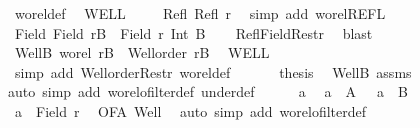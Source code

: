 \begin{isabellebody}
\ wo{\isacharunderscore}{\kern0pt}rel{\isacharunderscore}{\kern0pt}def\ \isamarkupfalse%
\ WELL\ \isacommand{{\isachardot}{\kern0pt}}\isamarkupfalse%
\isanewline
\ \ \isamarkupfalse%
\ Refl{\isacharcolon}{\kern0pt}\ {\isachardoublequoteopen}Refl\ r{\isachardoublequoteclose}\ \isamarkupfalse%
\ {\isacharparenleft}{\kern0pt}simp\ add{\isacharcolon}{\kern0pt}\ wo{\isacharunderscore}{\kern0pt}rel{\isachardot}{\kern0pt}REFL{\isacharparenright}{\kern0pt}\isanewline
\ \ \isamarkupfalse%
\ Field{\isacharcolon}{\kern0pt}\ {\isachardoublequoteopen}Field\ {\isacharquery}{\kern0pt}rB\ {\isacharequal}{\kern0pt}\ Field\ r\ Int\ B{\isachardoublequoteclose}\isanewline
\ \ \isamarkupfalse%
\ Refl{\isacharunderscore}{\kern0pt}Field{\isacharunderscore}{\kern0pt}Restr\ \isamarkupfalse%
\ blast\isanewline
\ \ \isamarkupfalse%
\ WellB{\isacharcolon}{\kern0pt}\ {\isachardoublequoteopen}wo{\isacharunderscore}{\kern0pt}rel\ {\isacharquery}{\kern0pt}rB\ {\isasymand}\ Well{\isacharunderscore}{\kern0pt}order\ {\isacharquery}{\kern0pt}rB{\isachardoublequoteclose}\ \isamarkupfalse%
\ WELL\isanewline
\ \ \isamarkupfalse%
\ {\isacharparenleft}{\kern0pt}simp\ add{\isacharcolon}{\kern0pt}\ Well{\isacharunderscore}{\kern0pt}order{\isacharunderscore}{\kern0pt}Restr\ wo{\isacharunderscore}{\kern0pt}rel{\isacharunderscore}{\kern0pt}def{\isacharparenright}{\kern0pt}\isanewline
\ \ \isanewline
\ \ \isamarkupfalse%
\ {\isacharquery}{\kern0pt}thesis\ \isamarkupfalse%
\ WellB\ assms\isanewline
\ \ \isamarkupfalse%
{\isacharparenleft}{\kern0pt}auto\ simp\ add{\isacharcolon}{\kern0pt}\ wo{\isacharunderscore}{\kern0pt}rel{\isachardot}{\kern0pt}ofilter{\isacharunderscore}{\kern0pt}def\ under{\isacharunderscore}{\kern0pt}def{\isacharparenright}{\kern0pt}\isanewline
\ \ \ \ \isamarkupfalse%
\ a\ \isamarkupfalse%
\ {\isachardoublequoteopen}a\ {\isasymin}\ A{\isachardoublequoteclose}\ \ {\isacharasterisk}{\kern0pt}{\isacharcolon}{\kern0pt}\ {\isachardoublequoteopen}a\ {\isasymin}\ B{\isachardoublequoteclose}\isanewline
\ \ \ \ \isamarkupfalse%
\ {\isachardoublequoteopen}a\ {\isasymin}\ Field\ r{\isachardoublequoteclose}\ \isamarkupfalse%
\ OFA\ Well\ \isamarkupfalse%
\ {\isacharparenleft}{\kern0pt}auto\ simp\ add{\isacharcolon}{\kern0pt}\ wo{\isacharunderscore}{\kern0pt}rel{\isachardot}{\kern0pt}ofilter{\isacharunderscore}{\kern0pt}def{\isacharparenright}{\kern0pt}\isanewline

\end{isabellebody}
